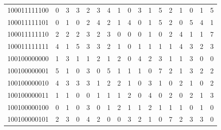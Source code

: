 \documentclass[10pt,a4paper]{article}
\begin{document}
\begin{longtable}{ |c|c|c|c|c|c|c|c|c|c|c|c|c|c|c|c|c| }
    100011111100              & 0                            & 3                                & 3                            & 2                              & 3   & 4   & 1   & 0   & 3   & 1   & 5   & 2   & 1   & 0   & 1   & 5   \\
    100011111101              & 0                            & 1                                & 0                            & 2                              & 4   & 2   & 1   & 4   & 0   & 1   & 5   & 2   & 0   & 5   & 4   & 1   \\
    100011111110              & 2                            & 2                                & 2                            & 3                              & 2   & 3   & 0   & 0   & 0   & 1   & 0   & 2   & 4   & 1   & 1   & 7   \\
    100011111111              & 4                            & 1                                & 5                            & 3                              & 3   & 2   & 1   & 0   & 1   & 1   & 1   & 1   & 4   & 3   & 2   & 3   \\
    100100000000              & 1                            & 3                                & 1                            & 1                              & 2   & 1   & 2   & 0   & 4   & 2   & 3   & 1   & 1   & 3   & 0   & 0   \\
    100100000001              & 5                            & 1                                & 0                            & 3                              & 0   & 5   & 1   & 1   & 1   & 0   & 7   & 2   & 1   & 3   & 2   & 2   \\
    100100000010              & 4                            & 3                                & 3                            & 3                              & 1   & 2   & 2   & 1   & 0   & 3   & 1   & 0   & 2   & 1   & 0   & 2   \\
    100100000011              & 1                            & 1                                & 0                            & 0                              & 1   & 1   & 1   & 2   & 0   & 4   & 0   & 2   & 0   & 2   & 1   & 3   \\
    100100000100              & 0                            & 1                                & 0                            & 3                              & 0   & 1   & 2   & 1   & 1   & 2   & 1   & 1   & 1   & 0   & 1   & 0   \\
    100100000101              & 2                            & 3                                & 0                            & 4                              & 2   & 0   & 0   & 3   & 2   & 1   & 0   & 7   & 2   & 3   & 3   & 0   \\

\end{longtable}
\end{document}
